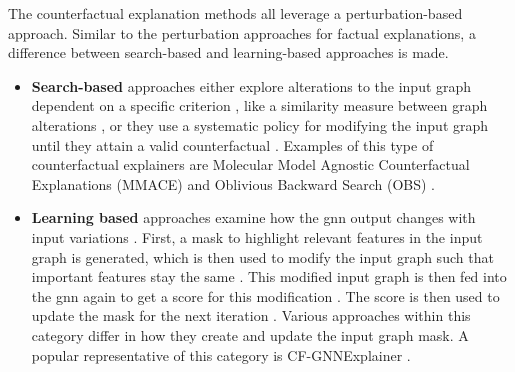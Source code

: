 The counterfactual explanation methods all leverage a perturbation-based approach. Similar to the perturbation approaches for factual explanations, a difference between search-based and learning-based approaches is made.


\begin{itemize}
    \item \textbf{Search-based} approaches either explore alterations to the input graph dependent on a specific criterion \cite{prado-romero_survey_2023}, like a similarity measure between graph alterations \cite{abrate_counterfactual_2021}, or they use a systematic policy for modifying the input graph until they attain a valid counterfactual \cite{prado-romero_survey_2023}. Examples of this type of counterfactual explainers are Molecular Model Agnostic Counterfactual Explanations (MMACE) \cite{wellawatte_model_2022} and Oblivious Backward Search (OBS) \cite{abrate_counterfactual_2021}.
    \item \textbf{Learning based} approaches examine how the \gls{gnn} output changes with input variations \cite{prado-romero_survey_2023}. First, a mask to highlight relevant features in the input graph is generated, which is then used to modify the input graph such that important features stay the same \cite{prado-romero_survey_2023}. This modified input graph is then fed into the \gls{gnn} again to get a score for this modification \cite{prado-romero_survey_2023}. The score is then used to update the mask for the next iteration \cite{prado-romero_survey_2023}. Various approaches within this category differ in how they create and update the input graph mask. A popular representative of this category is CF-GNNExplainer \cite{lucic_cf-gnnexplainer_2022}.
\end{itemize}

